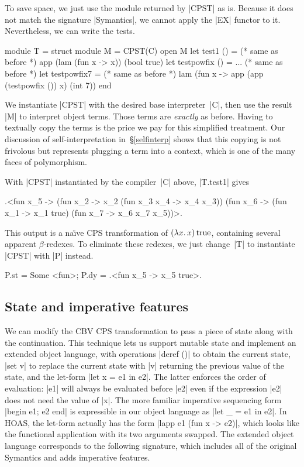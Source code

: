 To save space, we just
use the module returned by |CPST| as is. Because it does not
match the signature |Symantics|, we cannot apply the |EX| functor to it.
Nevertheless, we can write the tests.
\begin{code}
module T = struct
  module M = CPST(C)
  open M
  let test1 () = (* same as before *)
       app (lam (fun x -> x)) (bool true)
  let testpowfix () = ... (* same as before *)
  let testpowfix7 = (* same as before *)
       lam (fun x -> app (app (testpowfix ()) x) (int 7))
end
\end{code}
We instantiate |CPST| with the desired base interpreter~|C|,
then use the result |M| to
interpret object terms. Those terms are \emph{exactly} as before.
Having to textually copy the terms is the
price we pay for this simplified treatment.
Our discussion of self\hyp interpretation in~\S\ref{selfinterp} shows
that this copying is not frivolous but represents plugging a term into
a context, which is one of the many faces of polymorphism.

With 
|CPST| instantiated by the compiler~|C| above,
|T.test1| gives
\begin{code}
.<fun x_5 -> (fun x_2 -> x_2 (fun x_3 x_4 -> x_4 x_3))
             (fun x_6 -> (fun x_1 -> x_1 true)
                         (fun x_7 -> x_6 x_7 x_5))>.
\end{code}
This output is a na\"{\i}ve CPS transformation of $(\mathopen{\lambda\mathord{x}.\,}x)\mathinner{\mathrm{true}}$,
containing several apparent $\beta$-redexes.  To eliminate these
redexes, we just change~|T| to instantiate |CPST| with |P| instead.
\begin{code}
{P.st = Some <fun>; P.dy = .<fun x_5 -> x_5 true>.}
\end{code}

\subsection{State and imperative features}
\label{state}

We can modify the CBV CPS transformation to pass a piece of state
along with the continuation. This technique lets us support mutable
state and implement an extended object language, with operations
|deref ()| to obtain the current state, |set v| to replace the current
state with |v| returning the previous value of the state, and the
let-form |let x = e1 in e2|. The latter enforces the order of
evaluation: |e1| will always be evaluated before |e2| even if the
expression |e2| does not need the value of |x|. The more familiar
imperative sequencing form |begin e1; e2 end| is expressible in our
object language as |let _ = e1 in e2|.  In HOAS, the let-form actually
has the form |lapp e1 (fun x -> e2)|, which looks like the functional
application with its two arguments swapped.  The extended object
language corresponds to the following signature, which
includes all of the original Symantics and adds imperative features.

